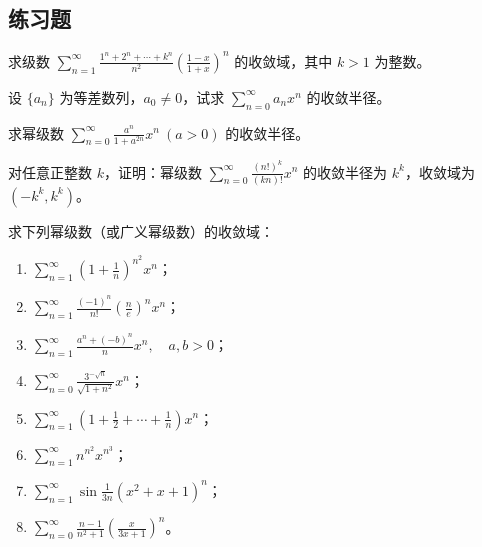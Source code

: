 \subsection{练习题}

\begin{xexercise}[1]
求级数 $\displaystyle\sum_{n=1}^{\infty}\frac{1^n+2^n+\cdots+k^n}{n^2}\left(\frac{1-x}{1+x}\right)^n$ 的收敛域，其中 $k>1$ 为整数。
\end{xexercise}

\begin{xexercise}[2]
设 $\{a_n\}$ 为等差数列，$a_0\ne0$，试求 $\displaystyle\sum_{n=0}^{\infty}a_nx^n$ 的收敛半径。
\end{xexercise}

\begin{xexercise}[3]
求幂级数 $\displaystyle\sum_{n=0}^{\infty}\frac{a^n}{1+a^{2n}}x^n\ (a>0)$ 的收敛半径。
\end{xexercise}

\begin{xexercise}[4]
对任意正整数 $k$，证明：幂级数 $\displaystyle\sum_{n=0}^{\infty}\frac{(n!)^k}{(kn)!}x^n$ 的收敛半径为 $k^k$，收敛域为 $(-k^k,k^k)$。
\end{xexercise}

\begin{xexercise}[5]
求下列幂级数（或广义幂级数）的收敛域：
  \begin{enumerate}[label=(\arabic*)]
    \item $\displaystyle\sum_{n=1}^{\infty}\left(1+\frac1n\right)^{n^2}x^n$；
    \item $\displaystyle\sum_{n=1}^{\infty}\frac{(-1)^n}{n!}\left(\frac ne\right)^n x^n$；
    \item $\displaystyle\sum_{n=1}^{\infty}\frac{a^n+(-b)^n}{n}x^n,\quad a,b>0$；
    \item $\displaystyle\sum_{n=0}^{\infty}\frac{3^{-\sqrt n}}{\sqrt{1+n^2}}x^n$；
    \item $\displaystyle\sum_{n=1}^{\infty}\left(1+\frac12+\cdots+\frac1n\right)x^n$；
    \item $\displaystyle\sum_{n=1}^{\infty}n^{n^2}x^{n^3}$；
    \item $\displaystyle\sum_{n=1}^{\infty}\sin\frac1{3n}(x^2+x+1)^n$；
    \item $\displaystyle\sum_{n=0}^{\infty}\frac{n-1}{n^2+1}\left(\frac{x}{3x+1}\right)^n$。
  \end{enumerate}
\end{xexercise}

